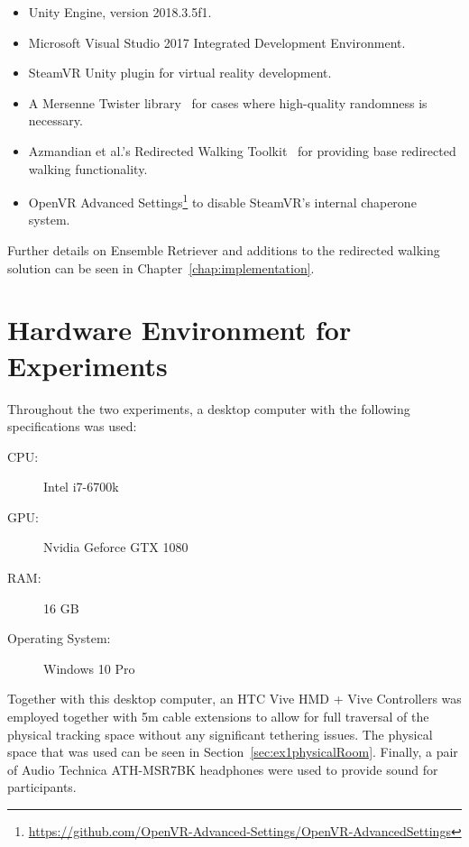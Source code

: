 \begin{itemize}
    \item Unity Engine, version 2018.3.5f1.
    \item Microsoft Visual Studio 2017 Integrated Development Environment.
    \item SteamVR Unity plugin for virtual reality development.
    \item A Mersenne Twister library~\cite{MersenneTwisterLibraryLink} for cases where high-quality randomness is necessary.
    \item Azmandian et al.'s Redirected Walking Toolkit~\cite{azmandian2016redirected} for providing base redirected walking functionality.
    \item OpenVR Advanced Settings\footnote{\url{https://github.com/OpenVR-Advanced-Settings/OpenVR-AdvancedSettings}} to disable SteamVR's internal chaperone system.
\end{itemize}

Further details on Ensemble Retriever and additions to the redirected walking solution can be seen in Chapter~\ref{chap:implementation}.

\section{Hardware Environment for Experiments}
Throughout the two experiments, a desktop computer with the following specifications was used:
\begin{description}
   \item[CPU:] Intel i7-6700k
   \item[GPU:] Nvidia Geforce GTX 1080
   \item[RAM:] 16 GB
   \item[Operating System:] Windows 10 Pro
\end{description}

Together with this desktop computer, an HTC Vive HMD + Vive Controllers was employed together with 5m cable extensions to allow for full traversal of the physical tracking space without any significant tethering issues. The physical space that was used can be seen in Section~\ref{sec:ex1physicalRoom}. Finally, a pair of Audio Technica ATH-MSR7BK headphones were used to provide sound for participants. 

